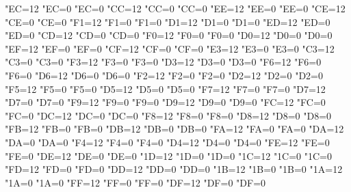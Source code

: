 {    \catcode"EC=12 \lccode"EC=0 \uccode"EC=0 %
    \catcode"CC=12 \lccode"CC=0 \uccode"CC=0 %
    \catcode"EE=12 \lccode"EE=0 \uccode"EE=0 %
    \catcode"CE=12 \lccode"CE=0 \uccode"CE=0 %
    \catcode"F1=12 \lccode"F1=0 \uccode"F1=0 %
    \catcode"D1=12 \lccode"D1=0 \uccode"D1=0 %
    \catcode"ED=12 \lccode"ED=0 \uccode"ED=0 %
    \catcode"CD=12 \lccode"CD=0 \uccode"CD=0 %
    \catcode"F0=12 \lccode"F0=0 \uccode"F0=0 %
    \catcode"D0=12 \lccode"D0=0 \uccode"D0=0 %
    \catcode"EF=12 \lccode"EF=0 \uccode"EF=0 %
    \catcode"CF=12 \lccode"CF=0 \uccode"CF=0 %
    \catcode"E3=12 \lccode"E3=0 \uccode"E3=0 %
    \catcode"C3=12 \lccode"C3=0 \uccode"C3=0 %
    \catcode"F3=12 \lccode"F3=0 \uccode"F3=0 %
    \catcode"D3=12 \lccode"D3=0 \uccode"D3=0 %
    \catcode"F6=12 \lccode"F6=0 \uccode"F6=0 %
    \catcode"D6=12 \lccode"D6=0 \uccode"D6=0 %
    \catcode"F2=12 \lccode"F2=0 \uccode"F2=0 %
    \catcode"D2=12 \lccode"D2=0 \uccode"D2=0 %
    \catcode"F5=12 \lccode"F5=0 \uccode"F5=0 %
    \catcode"D5=12 \lccode"D5=0 \uccode"D5=0 %
    \catcode"F7=12 \lccode"F7=0 \uccode"F7=0 %
    \catcode"D7=12 \lccode"D7=0 \uccode"D7=0 %
    \catcode"F9=12 \lccode"F9=0 \uccode"F9=0 %
    \catcode"D9=12 \lccode"D9=0 \uccode"D9=0 %
    \catcode"FC=12 \lccode"FC=0 \uccode"FC=0 %
    \catcode"DC=12 \lccode"DC=0 \uccode"DC=0 %
    \catcode"F8=12 \lccode"F8=0 \uccode"F8=0 %
    \catcode"D8=12 \lccode"D8=0 \uccode"D8=0 %
    \catcode"FB=12 \lccode"FB=0 \uccode"FB=0 %
    \catcode"DB=12 \lccode"DB=0 \uccode"DB=0 %
    \catcode"FA=12 \lccode"FA=0 \uccode"FA=0 %
    \catcode"DA=12 \lccode"DA=0 \uccode"DA=0 %
    \catcode"F4=12 \lccode"F4=0 \uccode"F4=0 %
    \catcode"D4=12 \lccode"D4=0 \uccode"D4=0 %
    \catcode"FE=12 \lccode"FE=0 \uccode"FE=0 %
    \catcode"DE=12 \lccode"DE=0 \uccode"DE=0 %
    \catcode"1D=12 \lccode"1D=0 \uccode"1D=0 %
    \catcode"1C=12 \lccode"1C=0 \uccode"1C=0 %
    \catcode"FD=12 \lccode"FD=0 \uccode"FD=0 %
    \catcode"DD=12 \lccode"DD=0 \uccode"DD=0 %
    \catcode"1B=12 \lccode"1B=0 \uccode"1B=0 %
    \catcode"1A=12 \lccode"1A=0 \uccode"1A=0 %
    \catcode"FF=12 \lccode"FF=0 \uccode"FF=0 %
    \catcode"DF=12 \lccode"DF=0 \uccode"DF=0 %
}

